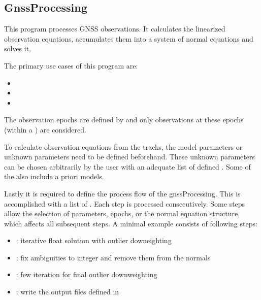 \subsection{GnssProcessing}\label{GnssProcessing}
This program processes GNSS observations. It calculates the linearized observation equations,
accumulates them into a system of normal equations and solves it.

The primary use cases of this program are:
\begin{itemize}
  \item {}
  \item {}
  \item {}
\end{itemize}

The observation epochs are defined by 
and only observations at these epochs (within a ) are considered.

To calculate observation equations from the tracks, the model parameters or unknown parameters need to be
defined beforehand. These unknown parameters can be chosen arbitrarily by the user with an adequate list of defined
.
Some of the  also include a priori models.

Lastly it is required to define the process flow of the gnssProcessing. This is accomplished
with a list of .
Each step is processed consecutively. Some steps allow the selection of parameters, epochs,
or the normal equation structure, which affects all subsequent steps.
A minimal example consists of following steps:
\begin{itemize}
  \item {}: iterative float solution with outlier downeighting
  \item {}:
        fix ambiguities to integer and remove them from the normals
  \item {}: few iteration for final outlier downweighting
  \item {}:
        write the output files defined in 
\end{itemize}

